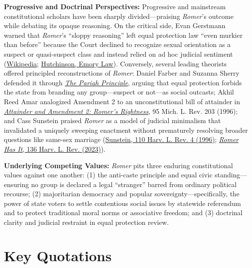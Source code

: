 \documentclass[12pt]{article}
\begin{document}
\textbf{Progressive and Doctrinal Perspectives:} Progressive and mainstream constitutional scholars have been sharply divided---praising \textit{Romer}'s outcome while debating its opaque reasoning. On the critical side, Evan Gerstmann warned that \textit{Romer}'s ``sloppy reasoning'' left equal protection law ``even murkier than before'' because the Court declined to recognize sexual orientation as a suspect or quasi-suspect class and instead relied on ad hoc judicial sentiment (\href{https://en.wikipedia.org/wiki/Romer_v._Evans}{Wikipedia}; \href{https://scholarlycommons.law.emory.edu/context/faculty-articles/article/1144/viewcontent/HutchinsonNotPolPowALR2014.pdf}{Hutchinson, Emory Law}). Conversely, several leading theorists offered principled reconstructions of \textit{Romer}: Daniel Farber and Suzanna Sherry defended it through \href{https://scholarship.law.vanderbilt.edu/cgi/viewcontent.cgi?article=1392&context=faculty-publications}{\textit{The Pariah Principle}}, arguing that equal protection forbids the state from branding any group---suspect or not---as social outcasts; Akhil Reed Amar analogized Amendment 2 to an unconstitutional bill of attainder in \href{https://repository.law.umich.edu/cgi/viewcontent.cgi?params=/context/mlr/article/4570}{\textit{Attainder and Amendment 2: Romer's Rightness}}, 95 Mich. L. Rev. 203 (1996); and Cass Sunstein praised \textit{Romer} as a model of judicial minimalism that invalidated a uniquely sweeping enactment without prematurely resolving broader questions like same-sex marriage (\href{http://scholarship.law.cornell.edu/cgi/viewcontent.cgi?article=1228&context=cjlpp}{Sunstein, 110 Harv. L. Rev. 4 (1996)}; \href{https://harvardlawreview.org/print/vol-136/emromer-em-has-it/}{\textit{Romer Has It}, 136 Harv. L. Rev. (2023)}).

\textbf{Underlying Competing Values:} \textit{Romer} pits three enduring constitutional values against one another: (1) the anti-caste principle and equal civic standing---ensuring no group is declared a legal ``stranger'' barred from ordinary political recourse; (2) majoritarian democracy and popular sovereignty---specifically, the power of state voters to settle contentious social issues by statewide referendum and to protect traditional moral norms or associative freedom; and (3) doctrinal clarity and judicial restraint in equal protection review.

\section{Key Quotations}
\end{document}
